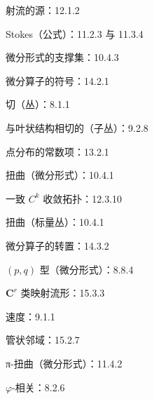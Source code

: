 射流的源：12.1.2

Stokes（公式）：11.2.3 与 11.3.4

微分形式的支撑集：10.4.3

微分算子的符号：14.2.1

切（丛）：8.1.1

与叶状结构相切的（子丛）：9.2.8

点分布的常数项：13.2.1

扭曲（微分形式）：10.4.1

一致 \(C^{k}\) 收敛拓扑：12.3.10

扭曲（标量丛）：10.4.1

微分算子的转置：14.3.2

\((p,q)\) 型（微分形式）：8.8.4

\(\mathbf{C}^r\) 类映射流形：15.3.3

速度：9.1.1

管状邻域：15.2.7

π-扭曲（微分形式）：11.4.2

\(\varphi\)-相关：8.2.6


